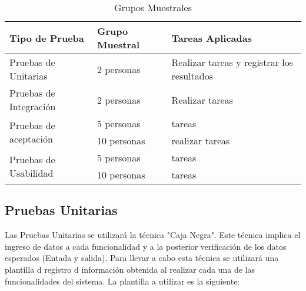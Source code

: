 \begin{table}[h]
	\begin{tabular}{|l|l|l|}
		\hline
		\textbf{Tipo de Prueba}                & \textbf{Grupo Muestral} & \textbf{Tareas Aplicadas}                  \\ \hline
		Pruebas de Unitarias                   & 2 personas              & Realizar tareas y registrar los resultados \\ \hline
		Pruebas de Integración                 & 2 personas              & Realizar tareas                            \\ \hline
		\multirow{2}{*}{Pruebas de aceptación} & 5 personas              & tareas                                     \\ \cline{2-3} 
		& 10 personas             & realizar tareas                            \\ \hline
		\multirow{2}{*}{Pruebas de Usabilidad} & 5 personas              & tareas                                     \\ \cline{2-3} 
		& 10 personas             & tareas                                     \\ \hline
	\end{tabular}
	\caption{Grupos Muestrales}
\end{table}


\subsection{Pruebas Unitarias}

Las Pruebas Unitarias se utilizará la técnica "Caja Negra". Este técnica implica el ingreso de datos a cada funcionalidad y a la posterior verificación de los datos esperados (Entada y salida). Para llevar a cabo esta técnica se utilizará una plantilla d registro d información obtenida al realizar cada una de las funcionalidades del sistema. La plantilla a utilizar es la siguiente:\\

